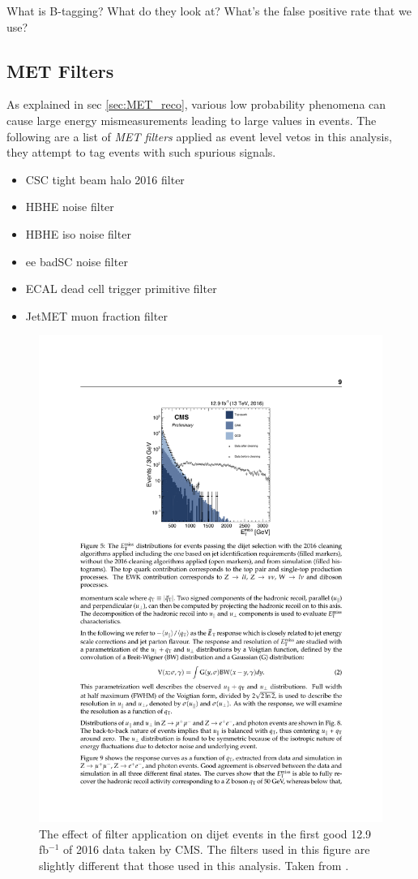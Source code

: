     What is B-tagging? What do they look at? What's the false positive rate that we use?

  \subsection{MET Filters} \label{sec:met_filters} 
    As explained in sec \ref{sec:MET_reco}, various low probability phenomena can cause large energy mismeasurements leading to large \MET values in events. The following are a list of \emph{MET filters} applied as event level vetos in this analysis, they attempt to tag events with such spurious signals.

    \begin{itemize}
    \item CSC tight beam halo 2016 filter
    \item HBHE noise filter
    \item HBHE iso noise filter
    \item ee badSC noise filter
    \item ECAL dead cell trigger primitive filter
    \item JetMET muon fraction filter
    \end{itemize}

    \begin{figure}
      \centering
      \includegraphics[width=.48\textwidth]{figures/met_filter_efficacy.pdf}
      \caption{The effect of \MET filter application on dijet events in the first good 12.9 fb$^{-1}$ of 2016 data taken by CMS. The filters used in this figure are slightly different that those used in this analysis. Taken from \cite{cms_met}.}
      \label{fig:met_filters_efficacy}
      \vspace{-10pt}
    \end{figure}

